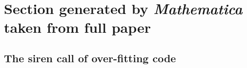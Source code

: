 \documentclass[11pt]{article}
\begin{document}
\section{Section generated by \emph{Mathematica\/} taken from full paper}\subsection{The siren call of over-fitting code}\label{over-fit}


\end{document}
